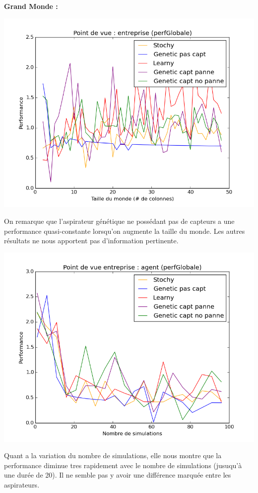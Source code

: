 \documentclass[12pt]{article}
\begin{document}
\textbf{Grand Monde : }
\begin{center}
\includegraphics[scale=0.5]{perfglob_tout}
\end{center}
\justify
On remarque que l'aspirateur génétique ne possédant pas de capteurs a une performance quasi-constante lorsqu'on augmente la taille du monde. Les autres résultats ne nous apportent pas d'information pertinente.
\begin{center}
\includegraphics[scale=0.5]{simu_perfglob_tout}
\end{center}
Quant a la variation du nombre de simulations, elle nous montre que la performance diminue tres rapidement avec le nombre de simulations (jusuqu'à une durée de 20). Il ne semble pas y avoir une différence marquée entre les aspirateurs. 
\end{document}

